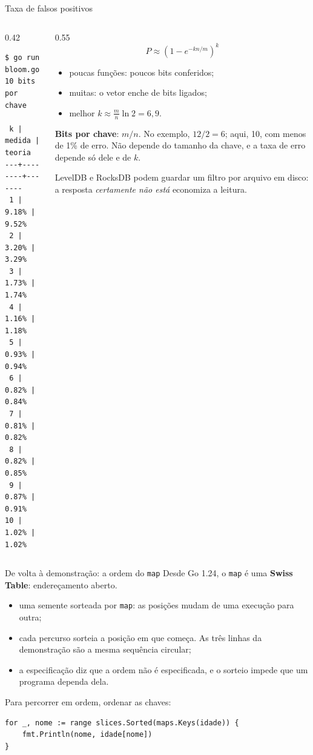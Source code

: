 \documentclass{beamer}
\begin{document}
\begin{frame}[fragile]{Taxa de falsos positivos}
	\begin{columns}
		\begin{column}{0.42\textwidth}
			\begin{verbatim}
$ go run bloom.go
10 bits por chave

 k | medida | teoria
---+--------+-------
 1 |  9.18% |  9.52%
 2 |  3.20% |  3.29%
 3 |  1.73% |  1.74%
 4 |  1.16% |  1.18%
 5 |  0.93% |  0.94%
 6 |  0.82% |  0.84%
 7 |  0.81% |  0.82%
 8 |  0.82% |  0.85%
 9 |  0.87% |  0.91%
10 |  1.02% |  1.02%
\end{verbatim}
		\end{column}
		\begin{column}{0.55\textwidth}
			\[
				P \approx \left(1 - e^{-kn/m}\right)^k
			\]

			\small
			\begin{itemize}
				\item poucas funções: poucos bits conferidos;
				\item muitas: o vetor enche de bits ligados;
				\item melhor $k \approx \frac{m}{n}\ln 2 = 6{,}9$.
			\end{itemize}

			\vspace{0.2cm}
			\textbf{Bits por chave}: $m/n$. No exemplo, $12/2 = 6$; aqui, 10, com
			menos de 1\% de erro. Não depende do tamanho da chave, e a taxa de erro
			depende só dele e de $k$.

			\vspace{0.2cm}
			\footnotesize LevelDB e RocksDB podem guardar um filtro por arquivo em
			disco: a resposta \emph{certamente não está} economiza a leitura.
		\end{column}
	\end{columns}
\end{frame}

\begin{frame}[fragile]{De volta à demonstração: a ordem do \texttt{map}}
	Desde Go 1.24, o \texttt{map} é uma \textbf{Swiss Table}: endereçamento aberto.

	\vspace{0.2cm}
	\begin{itemize}
		\item uma semente sorteada por \texttt{map}: as posições mudam de uma
		      execução para outra;
		\item cada percurso sorteia a posição em que começa. As três linhas da
		      demonstração são a mesma sequência circular;
		\item a especificação diz que a ordem não é especificada, e o sorteio impede
		      que um programa dependa dela.
	\end{itemize}

	\vspace{0.2cm}
	Para percorrer em ordem, ordenar as chaves:
	\begin{verbatim}
for _, nome := range slices.Sorted(maps.Keys(idade)) {
	fmt.Println(nome, idade[nome])
}
\end{verbatim}
\end{frame}
\end{document}
